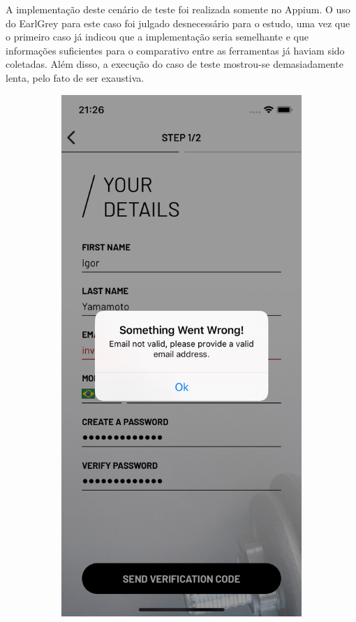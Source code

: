 A implementação deste cenário de teste foi realizada somente no Appium. O uso do EarlGrey para este caso foi julgado desnecessário para o estudo, uma vez que o primeiro caso já indicou que a implementação seria semelhante e que informações suficientes para o comparativo entre as ferramentas já haviam sido coletadas. Além disso, a execução do caso de teste mostrou-se demasiadamente lenta, pelo fato de ser exaustiva.

\begin{figure}[H]
	\centering
    \begin{subfigure}[b]{0.3\textwidth}
        \includegraphics[width=\textwidth]{pfc/figuras/email-not-valid.png}

\end{subfigure}
\end{figure}
